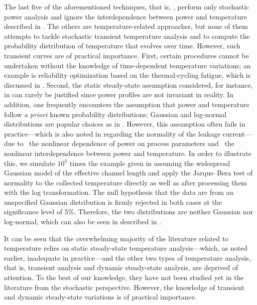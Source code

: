The last five of the aforementioned techniques, that is, \cite{bhardwaj2006,
vrudhula2006, ghanta2006, bhardwaj2008, shen2009}, perform only stochastic power
analysis and ignore the interdependence between power and temperature described
in . The others are temperature-related approaches, but none
of them attempts to tackle stochastic transient temperature analysis and to
compute the probability distribution of temperature that evolves over time.
However, such transient curves are of practical importance. First, certain
procedures cannot be undertaken without the knowledge of time-dependent
temperature variations; an example is reliability optimization based on the
thermal-cycling fatigue, which is discussed in .
Second, the static steady-state assumption considered, for instance, in
\cite{huang2009a, juan2011, juan2012, lee2013} can rarely be justified since
power profiles are not invariant in reality. In addition, one frequently
encounters the assumption that power and temperature follow \emph{a priori}
known probability distributions; Gaussian and log-normal distributions are
popular choices as in \cite{bhardwaj2006, srivastava2010, juan2012}. However,
this assumption often fails in practice---which is also noted in \cite{juan2012}
regarding the normality of the leakage current---due to \one~the nonlinear
dependence of power on process parameters and \two~the nonlinear interdependence
between power and temperature. In order to illustrate this, we simulate $10^4$
times the example given in  assuming the widespread Gaussian
model of the effective channel length and apply the Jarque--Bera test of
normality to the collected temperature directly as well as after processing them
with the log transformation. The null hypothesis that the data are from an
unspecified Gaussian distribution is firmly rejected in both cases at the
significance level of 5\%. Therefore, the two distributions are neither Gaussian
nor log-normal, which can also be seen in  described
in .

It can be seen that the overwhelming majority of the literature related to
temperature relies on static steady-state temperature analysis---which, as noted
earlier, inadequate in practice---and the other two types of temperature
analysis, that is, transient analysis and dynamic steady-state analysis, are
deprived of attention. To the best of our knowledge, they have not been studied
yet in the literature from the stochastic perspective. However, the knowledge of
transient and dynamic steady-state variations is of practical importance.

